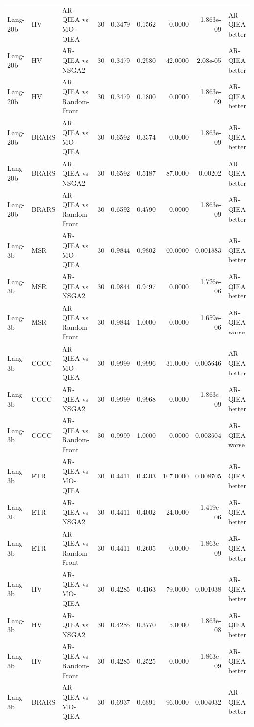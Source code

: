 \begin{tabular}{lllrrrrrl}
Lang-20b & HV & AR-QIEA vs MO-QIEA & 30 & 0.3479 & 0.1562 & 0.0000 & 1.863e-09 & AR-QIEA better \\
Lang-20b & HV & AR-QIEA vs NSGA2 & 30 & 0.3479 & 0.2580 & 42.0000 & 2.08e-05 & AR-QIEA better \\
Lang-20b & HV & AR-QIEA vs Random-Front & 30 & 0.3479 & 0.1800 & 0.0000 & 1.863e-09 & AR-QIEA better \\
Lang-20b & BRARS & AR-QIEA vs MO-QIEA & 30 & 0.6592 & 0.3374 & 0.0000 & 1.863e-09 & AR-QIEA better \\
Lang-20b & BRARS & AR-QIEA vs NSGA2 & 30 & 0.6592 & 0.5187 & 87.0000 & 0.00202 & AR-QIEA better \\
Lang-20b & BRARS & AR-QIEA vs Random-Front & 30 & 0.6592 & 0.4790 & 0.0000 & 1.863e-09 & AR-QIEA better \\
Lang-3b & MSR & AR-QIEA vs MO-QIEA & 30 & 0.9844 & 0.9802 & 60.0000 & 0.001883 & AR-QIEA better \\
Lang-3b & MSR & AR-QIEA vs NSGA2 & 30 & 0.9844 & 0.9497 & 0.0000 & 1.726e-06 & AR-QIEA better \\
Lang-3b & MSR & AR-QIEA vs Random-Front & 30 & 0.9844 & 1.0000 & 0.0000 & 1.659e-06 & AR-QIEA worse \\
Lang-3b & CGCC & AR-QIEA vs MO-QIEA & 30 & 0.9999 & 0.9996 & 31.0000 & 0.005646 & AR-QIEA better \\
Lang-3b & CGCC & AR-QIEA vs NSGA2 & 30 & 0.9999 & 0.9968 & 0.0000 & 1.863e-09 & AR-QIEA better \\
Lang-3b & CGCC & AR-QIEA vs Random-Front & 30 & 0.9999 & 1.0000 & 0.0000 & 0.003604 & AR-QIEA worse \\
Lang-3b & ETR & AR-QIEA vs MO-QIEA & 30 & 0.4411 & 0.4303 & 107.0000 & 0.008705 & AR-QIEA better \\
Lang-3b & ETR & AR-QIEA vs NSGA2 & 30 & 0.4411 & 0.4002 & 24.0000 & 1.419e-06 & AR-QIEA better \\
Lang-3b & ETR & AR-QIEA vs Random-Front & 30 & 0.4411 & 0.2605 & 0.0000 & 1.863e-09 & AR-QIEA better \\
Lang-3b & HV & AR-QIEA vs MO-QIEA & 30 & 0.4285 & 0.4163 & 79.0000 & 0.001038 & AR-QIEA better \\
Lang-3b & HV & AR-QIEA vs NSGA2 & 30 & 0.4285 & 0.3770 & 5.0000 & 1.863e-08 & AR-QIEA better \\
Lang-3b & HV & AR-QIEA vs Random-Front & 30 & 0.4285 & 0.2525 & 0.0000 & 1.863e-09 & AR-QIEA better \\
Lang-3b & BRARS & AR-QIEA vs MO-QIEA & 30 & 0.6937 & 0.6891 & 96.0000 & 0.004032 & AR-QIEA better \\

\end{tabular}
